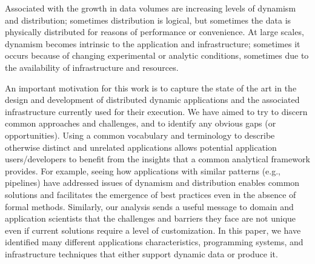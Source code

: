 Associated with the growth in data volumes are increasing levels of dynamism and
distribution; sometimes distribution is logical, but sometimes the data is
physically distributed for reasons of performance or convenience. At large
scales, dynamism becomes intrinsic to the application and infrastructure;
sometimes it occurs because of changing experimental or analytic conditions,
sometimes due to the availability of infrastructure and resources.

An important motivation for this work is to capture the state of the art in the
design and development of distributed dynamic applications and the associated
infrastructure currently used for their execution. We have aimed to try to
discern common approaches and challenges, and to identify any obvious gaps (or
opportunities). Using a common vocabulary and terminology to describe otherwise
distinct and unrelated applications allows potential application
users\slash developers to benefit from the insights that a common analytical framework
provides. For example, seeing how applications with similar patterns (e.g.,
pipelines) have addressed issues of dynamism and distribution enables common
solutions and facilitates the emergence of best practices even in the absence of
formal methods.  Similarly, our analysis sends a useful message to domain and
application scientists that the challenges and barriers they face are not unique
even if current solutions require a level of customization.  In this paper, we
have identified many different applications characteristics, programming
systems, and infrastructure techniques that either support dynamic data or
produce it.



